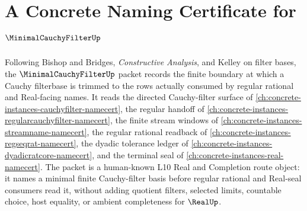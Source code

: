 \chapter{A Concrete Naming Certificate for $\MinimalCauchyFilterUp$}
\label{ch:concrete-instances-minimal-cauchy-filter-namecert}

Following Bishop and Bridges, \emph{Constructive Analysis}, and Kelley on filter bases, the $\MinimalCauchyFilterUp$ packet records the finite boundary at which a Cauchy filterbase is trimmed to the rows actually consumed by regular rational and Real-facing names. It reads the directed Cauchy-filter surface of \autoref{ch:concrete-instances-cauchyfilter-namecert}, the regular handoff of \autoref{ch:concrete-instances-regularcauchyfilter-namecert}, the finite stream windows of \autoref{ch:concrete-instances-streamname-namecert}, the regular rational readback of \autoref{ch:concrete-instances-regseqrat-namecert}, the dyadic tolerance ledger of \autoref{ch:concrete-instances-dyadicratcore-namecert}, and the terminal seal of \autoref{ch:concrete-instances-real-namecert}. The packet is a human-known L10 Real and Completion route object: it names a minimal finite Cauchy-filter basis before regular rational and Real-seal consumers read it, without adding quotient filters, selected limits, countable choice, host equality, or ambient completeness for $\RealUp$.


